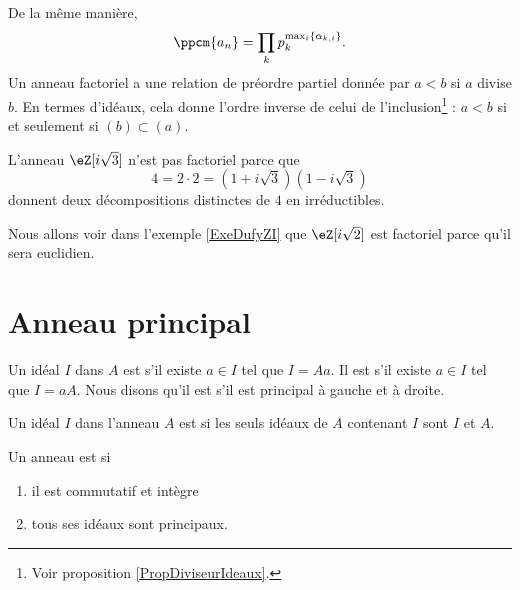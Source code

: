 De la même manière,
\begin{equation}
    \ppcm\{ a_n \}=\prod_kp_k^{\max_i\{ \alpha_{k,i} \}}.
\end{equation}
Un anneau factoriel a une relation de préordre partiel donnée par \( a<b\) si \( a\) divise \( b\). En termes d'idéaux, cela donne l'ordre inverse de celui de l'inclusion\footnote{Voir proposition \ref{PropDiviseurIdeaux}.} : \( a<b\) si et seulement si \( (b)\subset (a)\).

\begin{example} \label{EXooCWJUooCDJqkr}
    L'anneau \( \eZ[i\sqrt{3}]\) n'est pas factoriel parce que
    \begin{equation}
        4=2\cdot 2=(1+i\sqrt{3})(1-i\sqrt{3})
    \end{equation}
    donnent deux décompositions distinctes de \( 4\) en irréductibles.
\end{example}

Nous allons voir dans l'exemple \ref{ExeDufyZI} que \( \eZ[i\sqrt{2}]\) est factoriel parce qu'il sera euclidien.

\section{Anneau principal}

\begin{definition} 
    Un idéal \( I\) dans \( A\) est  s'il existe \( a\in I\) tel que \( I= A a\). Il est  s'il existe \( a\in I\) tel que \( I=a A\). Nous disons qu'il est  s'il est principal à gauche et à droite.
    
    Un idéal \( I\) dans l'anneau \( A\) est  si les seuls idéaux de \( A\) contenant \( I\) sont \( I\) et \( A\).
\end{definition}

\begin{definition}          \label{DEFooGWOZooXzUlhK}
    Un anneau est  si 
    \begin{enumerate}
        \item
            il est commutatif et intègre
        \item
            tous ses idéaux sont principaux.
    \end{enumerate}
\end{definition}

